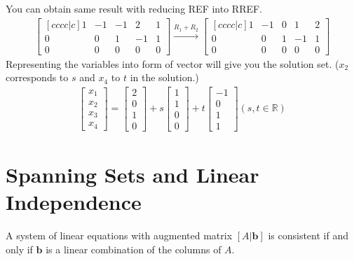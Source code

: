 You can obtain same result with reducing REF into RREF.
\begin{align*}
	\begin{bmatrix}[cccc|c]
	1 & -1 & -1 &  2 &  1 \\
	0 &  0 &  1 & -1 &  1 \\
	0 &  0 &  0 &  0 &  0
	\end{bmatrix} \xrightarrow{R_1 + R_2}
	\begin{bmatrix}[cccc|c]
	1 & -1 & 0 & 1 & 2 \\
	0 & 0 & 1 & -1 & 1 \\
	0 & 0 & 0 & 0 & 0
	\end{bmatrix}
\end{align*}
Representing the variables into form of vector will give you the solution set. ($x_2$ corresponds to $s$ and $x_4$ to $t$ in the solution.)
\begin{align*}
	\begin{bmatrix}
		x_1 \\ x_2 \\ x_3 \\ x_4
	\end{bmatrix} =
	\begin{bmatrix}
		2 \\ 0 \\ 1 \\ 0
	\end{bmatrix} + s
	\begin{bmatrix}
		1 \\ 1 \\ 0 \\ 0
	\end{bmatrix} + t
	\begin{bmatrix}
		-1 \\ 0 \\ 1 \\ 1
	\end{bmatrix} (s,t \in \mathbb{R})
\end{align*}

\section{Spanning Sets and Linear Independence}

\begin{theorem}
	A system of linear equations with augmented matrix $[A|\textbf{b}]$ is consistent if and only if $\textbf{b}$ is a linear combination of the columns of $A$.
\end{theorem}


